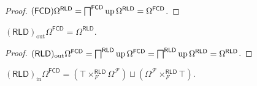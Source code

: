 \begin{proof}
  $(\mathsf{FCD}) \Omega^{\mathsf{RLD}} =
  \bigsqcap^{\mathsf{FCD}} \operatorname{up} \Omega^{\mathsf{RLD}} =
  \Omega^{\mathsf{FCD}}$.
\end{proof}

\begin{prop}
  $(\mathsf{RLD})_{\operatorname{out}} \Omega^{\mathsf{FCD}} =
  \Omega^{\mathsf{RLD}}$.
\end{prop}

\begin{proof}
  $(\mathsf{RLD})_{\operatorname{out}} \Omega^{\mathsf{FCD}} =
  \bigsqcap^{\mathsf{RLD}} \operatorname{up} \Omega^{\mathsf{FCD}} =
  \bigsqcap^{\mathsf{RLD}} \operatorname{up} \Omega^{\mathsf{RLD}} =
  \Omega^{\mathsf{RLD}}$.
\end{proof}

\begin{prop}
  $(\mathsf{RLD})_{\operatorname{in}} \Omega^{\mathsf{FCD}} = \left(
  \top \times^{\mathsf{RLD}}_F \Omega^{\mathscr{F}} \right) \sqcup
  \left( \Omega^{\mathscr{F}} \times^{\mathsf{RLD}}_F \top \right)$.
\end{prop}

